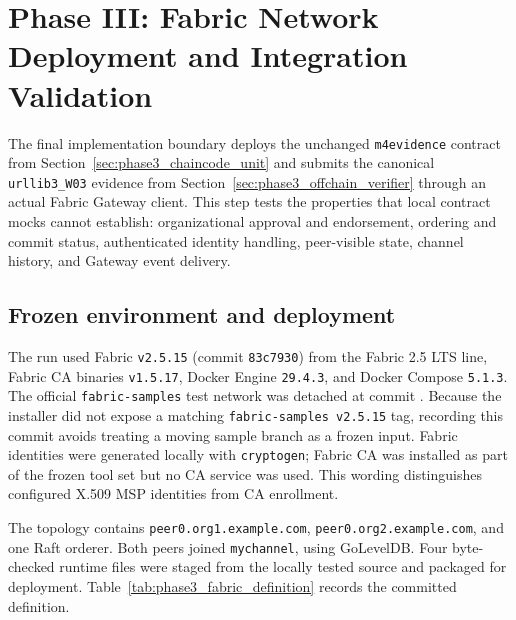 \section{Phase III: Fabric Network Deployment and Integration Validation}
\label{sec:phase3_fabric_network}

The final implementation boundary deploys the unchanged \texttt{m4evidence} contract from
Section~\ref{sec:phase3_chaincode_unit} and submits the canonical \texttt{urllib3\_W03} evidence from
Section~\ref{sec:phase3_offchain_verifier} through an actual Fabric Gateway client. This step tests the properties
that local contract mocks cannot establish: organizational approval and endorsement, ordering and commit status,
authenticated identity handling, peer-visible state, channel history, and Gateway event delivery.

\subsection{Frozen environment and deployment}
\label{sec:phase3_fabric_deployment}

The run used Fabric \texttt{v2.5.15} (commit \texttt{83c7930}) from the Fabric 2.5 LTS line, Fabric CA binaries
\texttt{v1.5.17}, Docker Engine \texttt{29.4.3}, and Docker Compose \texttt{5.1.3}. The official
\texttt{fabric-samples} test network was detached at commit
. Because the installer did not expose a matching
\texttt{fabric-samples v2.5.15} tag, recording this commit avoids treating a moving sample branch as a frozen input.
Fabric identities were generated locally with \texttt{cryptogen}; Fabric CA was installed as part of the frozen tool set
but no CA service was used. This wording distinguishes configured X.509 MSP identities from CA enrollment.

The topology contains \texttt{peer0.org1.example.com}, \texttt{peer0.org2.example.com}, and one Raft orderer. Both
peers joined \texttt{mychannel}, using GoLevelDB. Four byte-checked runtime files were staged from the locally tested
source and packaged for deployment. Table~\ref{tab:phase3_fabric_definition} records the committed definition.

